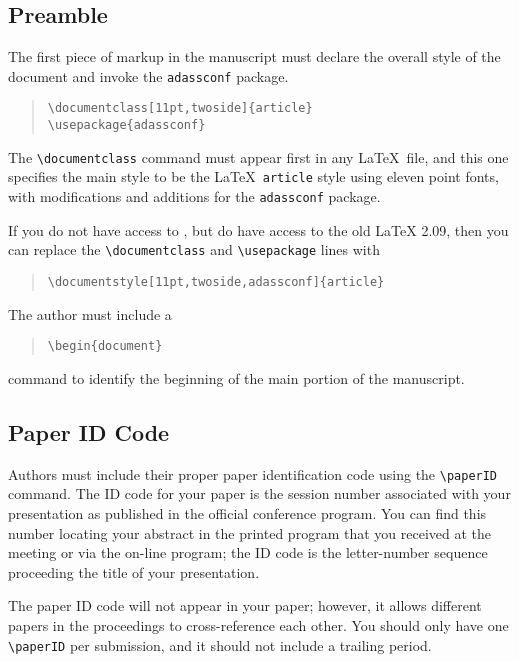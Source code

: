 \documentclass[11pt,twoside]{article}
\begin{document}
\subsection{Preamble}

The first piece of markup in the manuscript must declare the
overall style of the document and invoke the \verb+adassconf+ package.
\begin{quote}
\verb+\documentclass[11pt,twoside]{article}+\\
\verb+\usepackage{adassconf}+
\end{quote}
The \verb+\documentclass+ command must appear first in any
\LaTeX\ file, and this one specifies the main style to be
the \LaTeX\ \verb+article+ style using eleven point fonts,
with modifications and additions for the \verb+adassconf+ package.

If you do not have access to \LaTeXe, but do have access to the 
old \LaTeX{} 2.09, then you can replace the \verb+\documentclass+ and
\verb+\usepackage+ lines with
\begin{quote}
\verb+\documentstyle[11pt,twoside,adassconf]{article}+
\end{quote}

The author must include a
\begin{quote}
\verb+\begin{document}+
\end{quote}
command to identify the beginning of the main portion of the manuscript.

\subsection{Paper ID Code}
\addtocounter{footnote}{-1}
Authors must include their proper paper identification code using the
\verb+\paperID+ command.  The ID code for your paper is the session number
associated with your presentation as published in the official conference 
program.  You can find this number locating your
abstract in the printed program that you received at the meeting or
via the on-line program;
the ID code is the letter-number sequence proceeding the title of your
presentation.  

The paper ID code will not appear in your paper; however, it allows
different papers in the proceedings to cross-reference each other.
You should only have one \verb+\paperID+ per submission, and it
should not include a trailing period.
\end{document}
